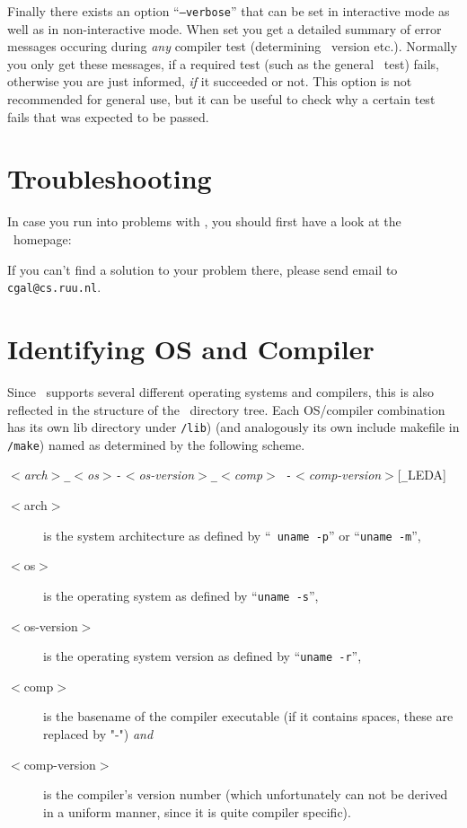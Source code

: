 Finally there exists an option ``\texttt{--verbose}'' that can be set in
interactive mode as well as in non-interactive mode. When set you get
a detailed summary of error messages occuring during \textit{any}
compiler test (determining \stl\ version etc.). Normally you only get
these messages, if a required test (such as the general \stl\ test)
fails, otherwise you are just informed, \textit{if} it succeeded or not.
This option is not recommended for general use, but it can be useful
to check why a certain test fails that was expected to be passed.

\section{Troubleshooting\label{sec:troubleshooting}}

In case you run into problems with \cgal, you should first have a look
at the \cgal\ homepage:
\begin{alltt}
\cgalhomepage
\end{alltt}
If you can't find a solution to your problem there, please send email
to \texttt{cgal@cs.ruu.nl}.

\section{Identifying OS and Compiler}\label{sec:os-compiler-id}

Since \cgal\ supports several different operating systems and
compilers, this is also reflected in the structure of the \cgal\ 
directory tree. Each OS/compiler combination has its own lib directory
under \texttt{\cgaldir/lib}) (and analogously its own include makefile
in \texttt{\cgaldir/make}) named as determined by the following
scheme.
\begin{center}
  \textit{$<$arch$>$\texttt{\_}$<$os$>$\texttt{-}$<$os-version$>$\texttt{\_}$<$comp$>${\tt
    -}$<$comp-version$>$}[\texttt{\_}LEDA]
\end{center}

\begin{description}
\item[$<$arch$>$] is the system architecture as defined by ``{\tt
    uname -p}'' or ``\texttt{uname -m}'',
\item[$<$os$>$] is the operating system as defined by ``\texttt{uname
    -s}'',
\item[$<$os-version$>$] is the operating system version as defined by
  ``\texttt{uname -r}'',
\item[$<$comp$>$] is the basename of the compiler executable (if it
  contains spaces, these are replaced by "-") \textit{and}
\item[$<$comp-version$>$] is the compiler's version number (which
  unfortunately can not be derived in a uniform manner, since it is
  quite compiler specific).
\end{description}

